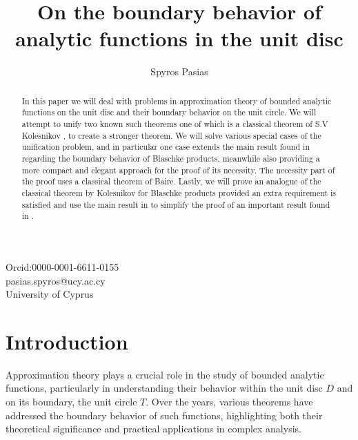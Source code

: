 \documentclass[12pt]{article}
\date{}
\begin{document}
\baselineskip 20pt
\title{On the boundary behavior of analytic functions in the unit disc}

\author{Spyros Pasias}


\maketitle
\begin{center}


\indent Orcid:0000-0001-6611-0155\\
\indent pasias.spyros@ucy.ac.cy\\
\indent University of Cyprus
\end{center}
\begin{abstract}
In this paper we will deal with problems in approximation theory of bounded analytic functions on the unit disc and their boundary behavior on the unit circle. We will attempt to unify two known such theorems one of which is a classical theorem of S.V Kolesnikov \cite{KO}, to create a stronger theorem. We will solve various special cases of the unification problem, and in particular one case extends the main result found in \cite{PE} regarding the boundary behavior of Blaschke products, meanwhile also providing a more compact and elegant approach for the proof of its necessity. The necessity part of the proof uses a classical theorem of Baire. Lastly, we will prove an analogue of the classical theorem by Kolesnikov for Blaschke products provided an extra requirement is satisfied and use the main result in \cite{PE} to simplify the proof of an important result found in \cite{PI}.
\end{abstract}

\section{Introduction}


Approximation theory plays a crucial role in the study of bounded analytic functions, particularly in understanding their behavior within the unit disc $D$ and on its boundary, the unit circle $T$. Over the years, various theorems have addressed the boundary behavior of such functions, highlighting both their theoretical significance and practical applications in complex analysis. 
\end{document}
